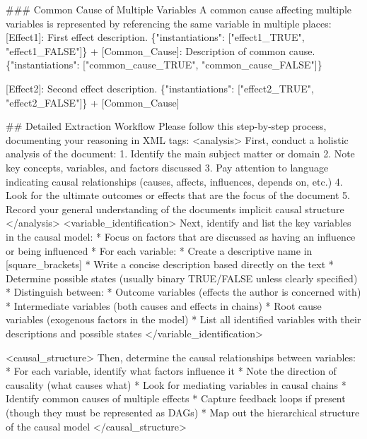 \documentclass[
  11pt,
  letterpaper,
]{book}
\newenvironment{Shaded}{\begin{snugshade}}{\end{snugshade}}
\newcommand{\StringTok}[1]{\textcolor[rgb]{0.13,0.47,0.30}{#1}}
\begin{document}
\begin{landscape}
\begin{Shaded}
\begin{Highlighting}[]
\StringTok{\#\#\# Common Cause of Multiple Variables}
\StringTok{A common cause affecting multiple variables is represented by referencing the same variable in multiple places:}
\StringTok{[Effect1]: First effect description. \{"instantiations": ["effect1\_TRUE", "effect1\_FALSE"]\}}
\StringTok{  + [Common\_Cause]: Description of common cause. \{"instantiations": ["common\_cause\_TRUE", "common\_cause\_FALSE"]\}}

\StringTok{[Effect2]: Second effect description. \{"instantiations": ["effect2\_TRUE", "effect2\_FALSE"]\}}
\StringTok{  + [Common\_Cause]}

\StringTok{\#\# Detailed Extraction Workflow}
\StringTok{Please follow this step{-}by{-}step process, documenting your reasoning in XML tags:}
\StringTok{\textless{}analysis\textgreater{}}
\StringTok{First, conduct a holistic analysis of the document:}
\StringTok{1. Identify the main subject matter or domain}
\StringTok{2. Note key concepts, variables, and factors discussed}
\StringTok{3. Pay attention to language indicating causal relationships (causes, affects, influences, depends on, etc.)}
\StringTok{4. Look for the ultimate outcomes or effects that are the focus of the document}
\StringTok{5. Record your general understanding of the document\textquotesingle{}s implicit causal structure}
\StringTok{\textless{}/analysis\textgreater{}}
\StringTok{\textless{}variable\_identification\textgreater{}}
\StringTok{Next, identify and list the key variables in the causal model:}
\StringTok{* Focus on factors that are discussed as having an influence or being influenced}
\StringTok{* For each variable:}
\StringTok{  * Create a descriptive name in [square\_brackets]}
\StringTok{  * Write a concise description based directly on the text}
\StringTok{  * Determine possible states (usually binary TRUE/FALSE unless clearly specified)}
\StringTok{* Distinguish between:}
\StringTok{  * Outcome variables (effects the author is concerned with)}
\StringTok{  * Intermediate variables (both causes and effects in chains)}
\StringTok{  * Root cause variables (exogenous factors in the model)}
\StringTok{* List all identified variables with their descriptions and possible states}
\StringTok{\textless{}/variable\_identification\textgreater{}}

\StringTok{\textless{}causal\_structure\textgreater{}}
\StringTok{Then, determine the causal relationships between variables:}
\StringTok{* For each variable, identify what factors influence it}
\StringTok{* Note the direction of causality (what causes what)}
\StringTok{* Look for mediating variables in causal chains}
\StringTok{* Identify common causes of multiple effects}
\StringTok{* Capture feedback loops if present (though they must be represented as DAGs)}
\StringTok{* Map out the hierarchical structure of the causal model}
\StringTok{\textless{}/causal\_structure\textgreater{}}


\end{Highlighting}
\end{Shaded}
\end{landscape}
\end{document}
